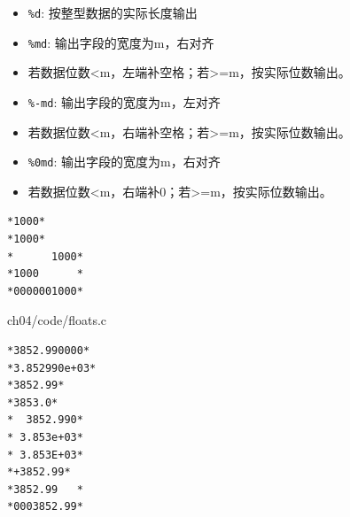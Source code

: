 \begin{frame}[fragile]
\begin{itemize}
\item \lstinline|%d|:  按整型数据的实际长度输出\\[0.1in]
\item \lstinline|%md|:  输出字段的宽度为m，右对齐\\ 
\item[] 若数据位数<m，左端补空格；若>=m，按实际位数输出。\\[0.1in]
\item \lstinline|%-md|: 输出字段的宽度为m，左对齐\\ 
\item[] 若数据位数<m，右端补空格；若>=m，按实际位数输出。\\[0.1in]
\item \lstinline|%0md|: 输出字段的宽度为m，右对齐 \\ 
\item[] 若数据位数<m，右端补0；若>=m，按实际位数输出。
\end{itemize}
\end{frame}

\begin{frame}[fragile]

\end{frame}

\begin{frame}[fragile]
\begin{lstlisting}[showspaces=true,backgroundcolor=\color{red!20}]
*1000*
*1000*
*      1000*
*1000      *
*0000001000*
\end{lstlisting}
\end{frame}


\begin{frame}

{ch04/code/floats.c}
\end{frame}

\begin{frame}[fragile]
\begin{lstlisting}[showspaces=true,backgroundcolor=\color{red!20}]
*3852.990000*
*3.852990e+03*
*3852.99*
*3853.0*
*  3852.990*
* 3.853e+03*
* 3.853E+03*
*+3852.99*
*3852.99   *
*0003852.99*
\end{lstlisting}
\end{frame}

